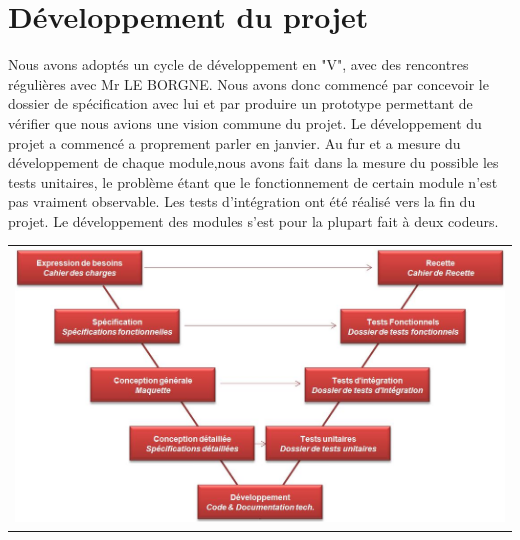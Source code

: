 \section{Développement du projet}

Nous avons adoptés un cycle de développement en "V", avec des rencontres régulières avec Mr LE BORGNE. Nous avons donc commencé par concevoir le dossier de spécification avec lui et par produire un prototype permettant de vérifier que nous avions une vision commune du projet. Le développement du projet a commencé a proprement parler en janvier. Au fur et a mesure du développement de chaque module,nous avons fait dans la mesure du possible les tests unitaires, le problème étant que le fonctionnement de certain module n'est pas vraiment observable. Les tests d'intégration ont été réalisé vers la fin du projet. Le développement des modules s'est pour la plupart fait à deux codeurs.

\begin{tabular}{c}
\includegraphics[width=140mm]{Images/Cycle_en_V.jpg}
\end{tabular}

